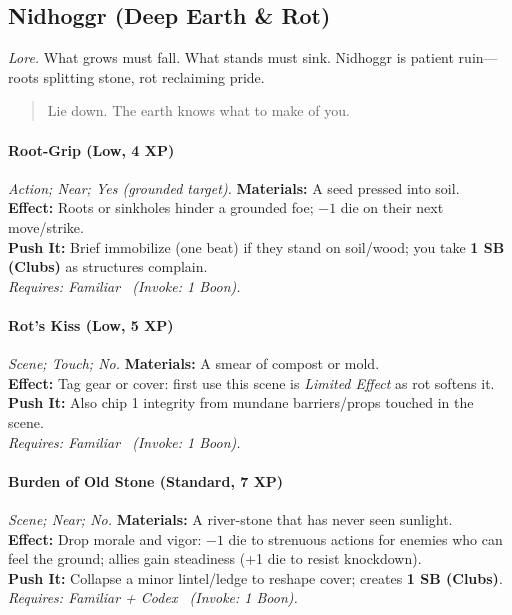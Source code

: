 \subsection{Nidhoggr (Deep Earth \& Rot)}
\textit{Lore.} What grows must fall. What stands must sink. Nidhoggr is patient ruin—roots splitting stone, rot reclaiming pride.

\begin{quote}
Lie down. The earth knows what to make of you.
\end{quote}

\paragraph{Root-Grip (Low, 4 XP)} \emph{Action; Near; Yes (grounded target).}
\textbf{Materials:} A seed pressed into soil.\\
\textbf{Effect:} Roots or sinkholes hinder a grounded foe; \(-1\) die on their next move/strike.\\
\textbf{Push It:} Brief immobilize (one beat) if they stand on soil/wood; you take \textbf{1 SB (Clubs)} as structures complain.\\
\emph{Requires: Familiar \ (\textit{Invoke:} 1 Boon).}

\paragraph{Rot’s Kiss (Low, 5 XP)} \emph{Scene; Touch; No.}
\textbf{Materials:} A smear of compost or mold.\\
\textbf{Effect:} Tag gear or cover: first use this scene is \emph{Limited Effect} as rot softens it.\\
\textbf{Push It:} Also chip 1 integrity from mundane barriers/props touched in the scene.\\
\emph{Requires: Familiar \ (\textit{Invoke:} 1 Boon).}

\paragraph{Burden of Old Stone (Standard, 7 XP)} \emph{Scene; Near; No.}
\textbf{Materials:} A river-stone that has never seen sunlight.\\
\textbf{Effect:} Drop morale and vigor: \(-1\) die to strenuous actions for enemies who can feel the ground; allies gain steadiness (+1 die to resist knockdown).\\
\textbf{Push It:} Collapse a minor lintel/ledge to reshape cover; creates \textbf{1 SB (Clubs)}.\\
\emph{Requires: Familiar + Codex \ (\textit{Invoke:} 1 Boon).}

